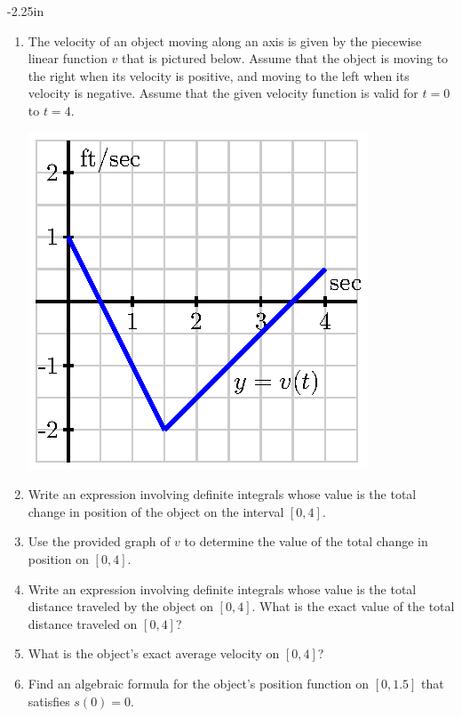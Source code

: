 \begin{adjustwidth*}{}{-2.25in}
\begin{multicols*}{2}
\begin{enumerate}[1),resume]
 \item The velocity of an object moving along an axis is given by the piecewise linear function $v$ that is pictured below.  Assume that the object is moving to the right when its velocity is positive, and moving to the left when its velocity is negative.  Assume that the given velocity function is valid for $t = 0$ to $t = 4$.
\begin{center}
\includegraphics[scale=.75]{figures/4_3_Ez1.eps}
\end{center}
	\ba
		\item Write an expression involving definite integrals whose value is the total change in position of the object on the interval $[0,4]$.
		\item Use the provided graph of $v$ to determine the value of the total change in position on $[0,4]$.
		\item Write an expression involving definite integrals whose value is the total distance traveled by the object on $[0,4]$.  What is the exact value of the total distance traveled on $[0,4]$?
		\item What is the object's exact average velocity on $[0,4]$?
		\item Find an algebraic formula for the object's position function on $[0, 1.5]$ that satisfies $s(0) = 0$.
	\ea
\end{enumerate}

\end{multicols*}
\end{adjustwidth*}

\afterexercises